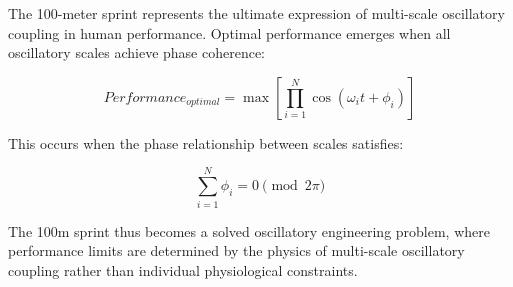 \documentclass[12pt]{article}
\begin{document}
The 100-meter sprint represents the ultimate expression of multi-scale oscillatory coupling in human performance. Optimal performance emerges when all oscillatory scales achieve phase coherence:

\begin{equation}
Performance_{optimal} = \max\left[\prod_{i=1}^{N} \cos(\omega_i t + \phi_i)\right]
\end{equation}

This occurs when the phase relationship between scales satisfies:

\begin{equation}
\sum_{i=1}^{N} \phi_i = 0 \pmod{2\pi}
\end{equation}

The 100m sprint thus becomes a solved oscillatory engineering problem, where performance limits are determined by the physics of multi-scale oscillatory coupling rather than individual physiological constraints.
\end{document}
